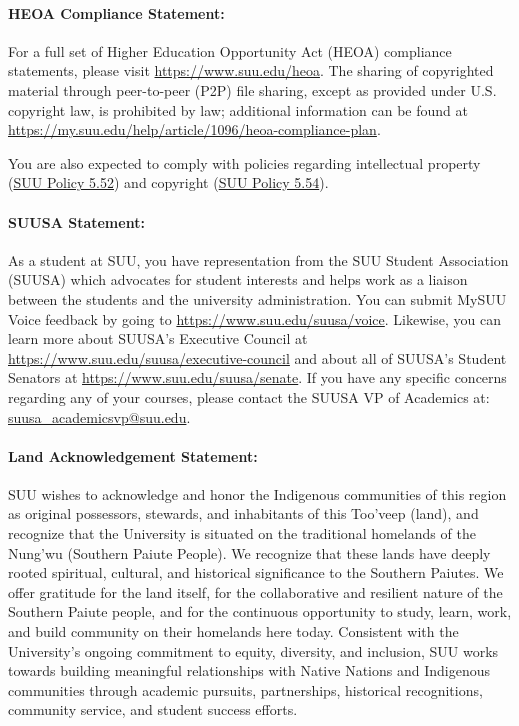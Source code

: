 \documentclass[12pt, letterpaper]{article}
\begin{document}
\paragraph{HEOA Compliance Statement:}
For a full set of Higher Education Opportunity Act (HEOA) compliance statements, please visit \href{https://www.suu.edu/heoa}{https://www.suu.edu/heoa}. The sharing of copyrighted material through peer-to-peer (P2P) file sharing, except as provided under U.S. copyright law, is prohibited by law; additional information can be found at \newline\href{https://my.suu.edu/help/article/1096/heoa-compliance-plan}{https://my.suu.edu/help/article/1096/heoa-compliance-plan}.

\noindent
You are also expected to comply with policies regarding intellectual property (\href{https://www.suu.edu/policies/05/52.html}{SUU Policy 5.52}) and copyright (\href{https://www.suu.edu/policies/05/54.html}{SUU Policy 5.54}).

\paragraph{SUUSA Statement:}
As a student at SUU, you have representation from the SUU Student Association (SUUSA) which advocates for student interests and helps work as a liaison between the students and the university administration. You can submit MySUU Voice feedback by going to \href{https://www.suu.edu/suusa/voice}{https://www.suu.edu/suusa/voice}. Likewise, you can learn more about SUUSA’s Executive Council at \href{https://www.suu.edu/suusa/executive-council}{https://www.suu.edu/suusa/executive-council} and about all of SUUSA’s Student Senators at \href{https://www.suu.edu/suusa/senate}{https://www.suu.edu/suusa/senate}. If you have any specific concerns regarding any of your courses, please contact the SUUSA VP of Academics at: \href{suusa_academicsvp@suu.edu}{suusa\_\ignorespaces academicsvp@suu.edu}.

\paragraph{Land Acknowledgement Statement:}
SUU wishes to acknowledge and honor the Indigenous communities of this region as original possessors, stewards, and inhabitants of this Too’veep (land), and recognize that the University is situated on the traditional homelands of the Nung’wu (Southern Paiute People). We recognize that these lands have deeply rooted spiritual, cultural, and historical significance to the Southern Paiutes. We offer gratitude for the land itself, for the collaborative and resilient nature of the Southern Paiute people, and for the continuous opportunity to study, learn, work, and build community on their homelands here today. Consistent with the University's ongoing commitment to equity, diversity, and inclusion, SUU works towards building meaningful relationships with Native Nations and Indigenous communities through academic pursuits, partnerships, historical recognitions, community service, and student success efforts.
\end{document}
